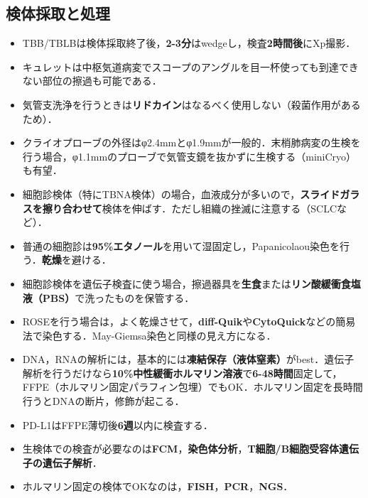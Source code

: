 \subsection{検体採取と処理}
\begin{itemize}

\item TBB/TBLBは検体採取終了後，\textbf{2-3分}はwedgeし，検査\textbf{2時間後}にXp撮影．
\item キュレットは中枢気道病変でスコープのアングルを目一杯使っても到達できない部位の擦過も可能である．
\item 気管支洗浄を行うときは\textbf{リドカイン}はなるべく使用しない（殺菌作用があるため）．
\item クライオプローブの外径はφ2.4mmとφ1.9mmが一般的．末梢肺病変の生検を行う場合，φ1.1mmのプローブで気管支鏡を抜かずに生検する（miniCryo）も有望．
\item 細胞診検体（特にTBNA検体）の場合，血液成分が多いので，\textbf{スライドガラスを擦り合わせて}検体を伸ばす．ただし組織の挫滅に注意する（SCLCなど）．
\item 普通の細胞診は\textbf{95\%エタノール}を用いて湿固定し，Papanicolaou染色を行う．\textbf{乾燥}を避ける．
\item 細胞診検体を遺伝子検査に使う場合，擦過器具を\textbf{生食}または\textbf{リン酸緩衝食塩液（PBS）}で洗ったものを保管する．
\item ROSEを行う場合は，よく乾燥させて，\textbf{diff-Quik}や\textbf{CytoQuick}などの簡易法で染色する．May-Giemsa染色と同様の見え方になる．
\item DNA，RNAの解析には，基本的には\textbf{凍結保存（液体窒素）}がbest．遺伝子解析を行うだけなら\textbf{10\%中性緩衝ホルマリン溶液}で\textbf{6-48時間}固定して，FFPE（ホルマリン固定パラフィン包埋）でもOK．ホルマリン固定を長時間行うとDNAの断片，修飾が起こる．
\item PD-L1はFFPE薄切後\textbf{6週}以内に検査する．
\item 生検体での検査が必要なのは\textbf{FCM}，\textbf{染色体分析}，\textbf{T細胞/B細胞受容体遺伝子の遺伝子解析}．
\item ホルマリン固定の検体でOKなのは，\textbf{FISH}，\textbf{PCR}，\textbf{NGS}．



\end{itemize}
